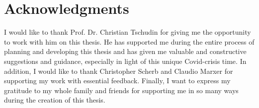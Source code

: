 \chapter{Acknowledgments}
I would like to thank Prof. Dr. Christian Tschudin for giving me the opportunity to work with him on this thesis. He has supported me during the entire process of planning and developing this thesis and has given me valuable and constructive suggestions and guidance, especially in light of this unique Covid-crisis time. In addition, I would like to thank Christopher Scherb and Claudio Marxer for supporting my work with essential feedback. Finally, I want to express my gratitude to my whole family and friends for supporting me in so many ways during the creation of this thesis.
